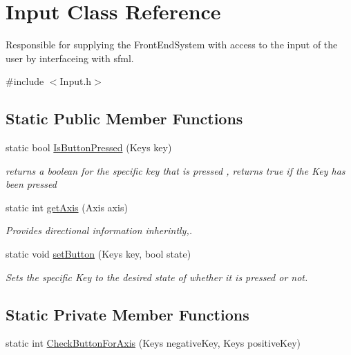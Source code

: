 \hypertarget{class_input}{}\section{Input Class Reference}
\label{class_input}


Responsible for supplying the Front\+End\+System with access to the input of the user by interfaceing with sfml.  




{\ttfamily \#include $<$Input.\+h$>$}

\subsection*{Static Public Member Functions}
\begin{DoxyCompactItemize}
\item 
static bool \hyperlink{class_input_abb8551549ffe7b1474aca91ce3509d57}{Is\+Button\+Pressed} (Keys key)
\begin{DoxyCompactList}\small\item\em returns a boolean for the specific key that is pressed , returns true if the Key has been pressed \end{DoxyCompactList}\item 
static int \hyperlink{class_input_a5c4b1c67c7d3e28d4af79601c81ed8bb}{get\+Axis} (Axis axis)
\begin{DoxyCompactList}\small\item\em Provides directional information inherintly,. \end{DoxyCompactList}\item 
static void \hyperlink{class_input_a851f7b43b30dcf7166af7c548d21316f}{set\+Button} (Keys key, bool state)
\begin{DoxyCompactList}\small\item\em Sets the specific Key to the desired state of whether it is pressed or not. \end{DoxyCompactList}\end{DoxyCompactItemize}
\subsection*{Static Private Member Functions}
\begin{DoxyCompactItemize}
\item 
static int \hyperlink{class_input_a7419956b2d6001cef104b8abdf242477}{Check\+Button\+For\+Axis} (Keys negative\+Key, Keys positive\+Key)
\end{DoxyCompactItemize}
